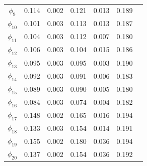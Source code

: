 \documentclass[12pt,a4paper]{article}
\begin{document}
\begin{CJK}{UTF8}{bkai}
\begin{table}
\begin{tabular}{ccccccc}
$ \phi_9$   & 0.114 & 0.002 & 0.121 & 0.013 & 0.189 & \\
$\phi_{10}$ & 0.101 & 0.003 & 0.113 & 0.013 & 0.187 & \\
$\phi_{11}$ & 0.104 & 0.003 & 0.112 & 0.007 & 0.180 & \\
$\phi_{12}$ & 0.106 & 0.003 & 0.104 & 0.015 & 0.186 & \\
$\phi_{13}$ & 0.095 & 0.003 & 0.095 & 0.003 & 0.190 & \\
$\phi_{14}$ & 0.092 & 0.003 & 0.091 & 0.006 & 0.183 & \\
$\phi_{15}$ & 0.089 & 0.003 & 0.090 & 0.005 & 0.180 & \\
$\phi_{16}$ & 0.084 & 0.003 & 0.074 & 0.004 & 0.182 & \\
$\phi_{17}$ & 0.148 & 0.002 & 0.165 & 0.016 & 0.194 & \\
$\phi_{18}$ & 0.133 & 0.003 & 0.154 & 0.014 & 0.191 & \\
$\phi_{19}$ & 0.155 & 0.002 & 0.180 & 0.036 & 0.194 & \\
$\phi_{20}$ & 0.137 & 0.002 & 0.154 & 0.036 & 0.192 & \\
\hline
\end{tabular}
\label{tab:5}
\end{table}
\noindent


\end{CJK}
\end{document}
